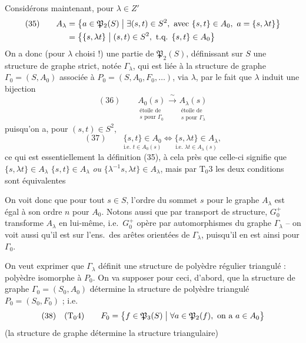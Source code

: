 \documentclass[11pt,a4paper]{article}
\begin{document}
Considérons maintenant, pour $\lambda \in Z'$
\[
\begin{aligned}
(35) \qquad A_\lambda &= \bigl\{ a \in \mathfrak{P}_2(S) \bigm| \exists (s, t) \in S^2, \text{ avec } \{s, t\} \in A_0, \ a = \{s, \lambda t\} \bigr\} \\
&= \bigl\{ \{s, \lambda t\} \bigm| (s, t) \in S^2, \text{ t.q. } \{s, t\} \in A_0 \bigr\}
\end{aligned}
\]
On a donc (pour $\lambda$ choisi !)  une partie de $\mathfrak{P}_2(S)$, définissant sur $S$ une structure de graphe strict, notée $\Gamma_\lambda$, qui est liée à la structure de graphe $\Gamma_0 = (S, A_0)$ associée à $P_0 = (S, A_0, F_0, \ldots)$, via $\lambda$, par le fait que $\lambda$ induit une bijection
\[
(36) \qquad
\underset{\substack{\text{étoile de} \\ s \text{ pour } \Gamma_0}}{A_0(s)}
\xrightarrow{\ \sim\ }
\underset{\substack{\text{étoile de} \\ s \text{ pour } \Gamma_\lambda}}{A_\lambda(s)}
\]
puisqu'on a, pour $(s, t) \in S^2$,
\[
(37) \qquad
\underset{\text{i.e.\ } t \in A_0(s)}{\{s, t\} \in A_0}
\iff
\underset{\text{i.e.\ } \lambda t \in A_\lambda(s)}{\{s, \lambda t\} \in A_\lambda} ,
\]
ce qui est essentiellement la définition (35), à cela près que celle-ci signifie que $\{s, \lambda t\} \in A_\lambda$    $\{s, t\} \in A_\lambda$ \emph{ou} $\{\lambda^{-1} s, \lambda t\} \in A_\lambda$, mais par $\text{T}_0 3$ les deux conditions sont équivalentes

On voit donc que pour tout $s \in S$, l'ordre du sommet $s$ pour le graphe $A_\lambda$ est \struck{\ill{}} égal à son ordre $n$ pour $A_0$. Notons aussi que par transport de structure, $G_0^{+}$  transforme $A_\lambda$ en lui-même, i.e.\ $G_0^{+}$ opère par automorphismes du graphe $\Gamma_\lambda$ --  on voit aussi qu'il est    sur l'ens.\ des arêtes orientées de $\Gamma_\lambda$, puisqu'il en est ainsi pour $\Gamma_0$.

On veut exprimer que $\Gamma_\lambda$ définit une structure de polyèdre régulier triangulé  \uncertain{-}  : polyèdre isomorphe à $P_0$. On va supposer pour ceci, d'abord, que la structure de graphe $\Gamma_0 = (S_0, A_0)$ détermine la structure de polyèdre triangulé $P_0 = (S_0, F_0)$ ; i.e.\
\[
(38) \quad (\text{T}_0 4) \qquad F_0 = \bigl\{ f \in \mathfrak{P}_3(S) \bigm| \forall a \in \mathfrak{P}_2(f), \text{ on a } a \in A_0 \bigr\}
\]
(la structure de graphe détermine la structure triangulaire)
\end{document}
